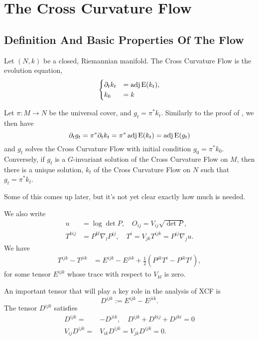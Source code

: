 \documentclass[a4paper, 12pt]{amsart}
\begin{document}
\section{The Cross Curvature Flow}
\label{sec:xcf}

\subsection{Definition And Basic Properties Of  The Flow}
\label{subsec:xcf_defn}

Let \((N, k)\) be a closed, Riemannian manifold. The Cross Curvature Flow is the evolution equation,
\begin{equation}
\label{eq:xcf}
\begin{cases}
\partial_t k_t  &= \operatorname{adj}\operatorname{E}(k_t), \\
k_0 &= k
\end{cases}
\end{equation}

\begin{rem}
Let \(\pi : M \to N\) be the universal cover, and \(g_t = \pi^{\ast} k_t\). Similarly to the proof of , we then have
\[
\partial_t g_t = \pi^{\ast} \partial_t k_t = \pi^{\ast} \operatorname{adj}\operatorname{E}(k_t) = \operatorname{adj}\operatorname{E}(g_t)
\]
and \(g_t\) solves the Cross Curvature Flow with initial condition \(g_0 = \pi^{\ast} k_0\). Conversely, if \(g_t\) is a \(G\)-invariant solution of the Cross Curvature Flow on \(M\), then there is a unique solution, \(k_t\) of the Cross Curvature Flow on \(N\) such that \(g_t = \pi^{\ast} k_t\).
\end{rem}

{\color{red} Some of this comes up later, but it's not yet clear exactly how much is needed.}

We also write
\begin{align}
 u&=\log\det P,\quad
O_{ij}=V_{ij}\sqrt{\det P},\\
T^{kij}&=P^{kl}\nabla_l P^{ij},\quad T^i=V_{jk}T^{ijk}=P^{ij}\nabla_ju.
\end{align}
We have
\begin{align}
    T^{ijk}-T^{jik}&=E^{ijk}-E^{jik}+\frac{1}{2}\left(P^{jk}T^i-P^{ik}T^j\right),
\end{align}
for some tensor $E^{ijk}$ whose trace with respect to $V_{kl}$ is zero.

An important tensor that will play a key role in the analysis of XCF is
\[D^{ijk}:=E^{ijk}-E^{jik}.\]
The tensor $D^{ijk}$ satisfies
\begin{align}
D^{ijk}=&-D^{jik},\quad D^{ijk}+D^{kij}+D^{jki}=0\\
V_{ij}D^{ijk}=&V_{ik}D^{ijk}=V_{jk}D^{ijk}=0.
\end{align}
\end{document}
